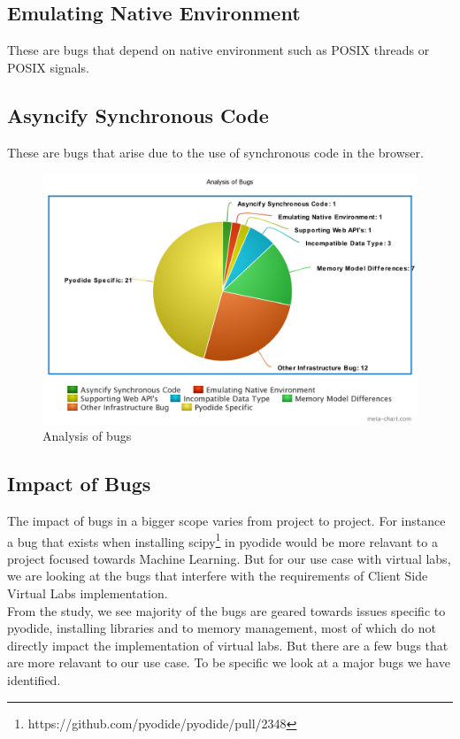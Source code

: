 \subsection*{Emulating Native Environment}
These are bugs that depend on native environment such as POSIX threads or POSIX signals. 
\subsection*{Asyncify Synchronous Code}
These are bugs that arise due to the use of synchronous code in the browser. 

\begin{figure}[h]
    \centering
    \includegraphics[width=0.8\linewidth]{images/meta-chart.png}
    \caption{Analysis of bugs}
    \label{fig:bug_analysis}
\end{figure}

\subsection{Impact of Bugs}
The impact of bugs in a bigger scope varies from project to project. For instance a bug that exists when installing scipy\footnote{https://github.com/pyodide/pyodide/pull/2348} in pyodide would be more relavant to a project focused towards Machine Learning. But for our use case with virtual labs, we are looking at the bugs that interfere with the requirements of Client Side Virtual Labs implementation. \\
From the study, we see majority of the bugs are geared towards issues specific to pyodide, installing libraries and to memory management, most of which do not directly impact the implementation of virtual labs. But there are a few bugs that are more relavant to our use case. To be specific we look at a major bugs we have identified. \\

